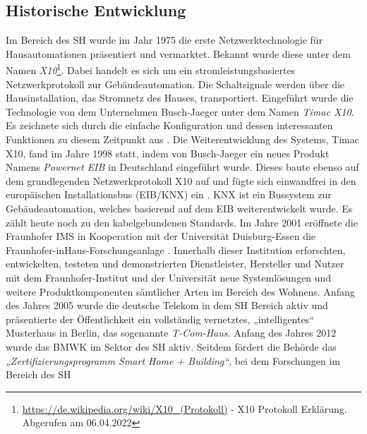     \subsection{Historische Entwicklung}
    \label{subsec:entwicklung_sh}
        Im Bereich des \acl{SH} wurde im Jahr 1975 die erste Netzwerktechnologie für Hausautomationen 
        präsentiert und vermarktet. Bekannt wurde diese unter dem Namen \textit{X10}\footnote{\url{https://de.wikipedia.org/wiki/X10_(Protokoll)} - X10 Protokoll Erklärung. Abgerufen am 06.04.2022}. 
        Dabei handelt es sich um ein stromleistungsbasiertes Netzwerkprotokoll zur Gebäudeautomation. Die 
        Schaltsignale werden über die Hausinstallation, das Stromnetz des Hauses, transportiert. Eingeführt wurde die 
        Technologie von dem Unternehmen Busch-Jaeger unter dem Namen \textit{Timac X10}. Es zeichnete sich durch die 
        einfache Konfiguration und dessen interessanten Funktionen zu diesem Zeitpunkt aus \cite{aschendorf2014energiemanagement}. %
        Die Weiterentwicklung des Systems, Timac X10, fand im Jahre 1998 statt, indem von Busch-Jaeger ein neues 
        Produkt Namens \textit{Powernet EIB} in Deutschland eingeführt wurde. Dieses baute ebenso auf dem grundlegenden 
        Netzwerkprotokoll X10 auf und fügte sich einwandfrei in den europäischen Installationsbus (EIB/KNX) ein \cite{busch-jaeger}. 
        KNX ist ein Bussystem zur Gebäudeautomation, welches basierend auf dem EIB weiterentwickelt wurde. Es 
        zählt heute noch zu den kabelgebundenen Standards. Im Jahre 2001 eröffnete die Fraunhofer IMS in Kooperation 
        mit der Universität Duisburg-Essen die Fraunhofer-inHaus-Forschungsanlage \cite{fraunhofer-forschungsanlage}. 
        Innerhalb dieser Institution erforschten, entwickelten, testeten und demonstrierten Dienstleister, Hersteller und Nutzer 
        mit dem Fraunhofer-Institut und der Universität neue Systemlösungen und weitere Produktkomponenten sämtlicher Arten 
        im Bereich des Wohnens. Anfang des Jahres 2005 wurde die deutsche Telekom in dem \acl{SH} Bereich aktiv und 
        präsentierte der Öffentlichkeit ein vollständig vernetztes, „intelligentes“ Musterhaus in Berlin, das sogenannte 
        \textit{T-Com-Haus}. Anfang des Jahres 2012 wurde das \ac{BMWK} im Sektor des \acl{SH} aktiv. Seitdem fördert die 
        Behörde das \textit{„Zertifizierungsprogramm Smart Home + Building“}, bei dem Forschungen im Bereich des \acl{SH} 

